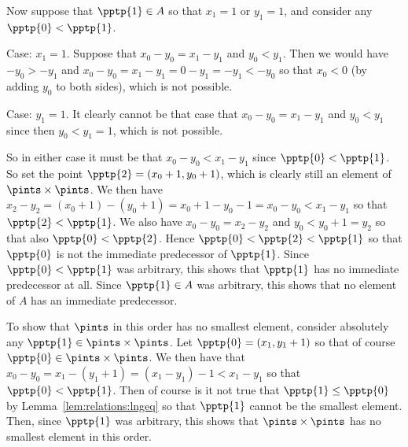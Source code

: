 {{    Now suppose that $\pptp{1} \in A$ so that $x_1 = 1$ or $y_1 = 1$, and consider any $\pptp{0} < \pptp{1}$.

    Case: $x_1 = 1$.
    Suppose that $x_0-y_0 = x_1-y_1$ and $y_0 < y_1$.
    Then we would have $-y_0 > -y_1$ and $x_0-y_0 = x_1-y_1 = 0 - y_1 = -y_1 < -y_0$ so that $x_0 < 0$ (by adding $y_0$ to both sides), which is not possible.

    Case: $y_1 = 1$.
    It clearly cannot be that case that $x_0-y_0 = x_1-y_1$ and $y_0 < y_1$ since then $y_0 < y_1 = 1$, which is not possible.

    So in either case it must be that $x_0-y_0 < x_1-y_1$ since $\pptp{0} < \pptp{1}$.
    So set the point $\pptp{2} = (x_0+1,y_0+1)$, which is clearly still an element of $\pintss$.
    We then have $x_2-y_2 = (x_0+1)-(y_0+1) = x_0+1-y_0-1 = x_0-y_0 < x_1-y_1$ so that $\pptp{2} < \pptp{1}$.
    We also have $x_0-y_0 = x_2-y_2$ and $y_0 < y_0+1 = y_2$ so that also $\pptp{0} < \pptp{2}$.
    Hence $\pptp{0} < \pptp{2} < \pptp{1}$ so that $\pptp{0}$ is not the immediate predecessor of $\pptp{1}$.
    Since $\pptp{0} < \pptp{1}$ was arbitrary, this shows that $\pptp{1}$ has no immediate predecessor at all.
    Since $\pptp{1} \in A$ was arbitrary, this shows that no element of $A$ has an immediate predecessor.

    To show that $\pints$ in this order has no smallest element, consider absolutely any $\pptp{1} \in \pintss$.
    Let $\pptp{0} = (x_1,y_1+1)$ so that of course $\pptp{0} \in \pintss$.
    We then have that $x_0 - y_0 = x_1 - (y_1+1) = (x_1 - y_1) - 1 < x_1 - y_1$ so that $\pptp{0} < \pptp{1}$.
    Then of course is it not true that $\pptp{1} \leq \pptp{0}$ by Lemma~\ref{lem:relations:lngeq} so that $\pptp{1}$ cannot be the smallest element.
    Then, since $\pptp{1}$ was arbitrary, this shows that $\pintss$ has no smallest element in this order.
  }

}
